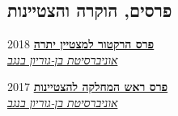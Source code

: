 \documentclass[
	11pt,a4paper %
]{article}
\newcommand{\tableentry}[3]{
	\textsc{#1} & #2\expandafter\ifstrequal\expandafter{#3}{}{\\}{\\[5pt]} %
}
\begin{document}
\begin{hebrew}
\begin{paracol}{2}



	\section{פרסים, הוקרה והצטיינות}




\href{https://loona-il.000webhostapp.com/resume-references/BA-and-honorary.pdf}{\textbf{פרס הרקטור למצטיין יתרה}}
\hfill
2018
 \\
\textit{\href{https://loona-il.000webhostapp.com/resume-references/BA-and-honorary.pdf}{אוניברסיטת בן-גוריון בנגב}}

\href{https://loona-il.000webhostapp.com/resume-references/BA-and-honorary.pdf}{\textbf{פרס ראש המחלקה להצטיינות}}
\hfill
2017
\\
\textit{\href{https://loona-il.000webhostapp.com/resume-references/BA-and-honorary.pdf}{אוניברסיטת בן-גוריון בנגב}}



\end{paracol}
\end{hebrew}
\end{document}
